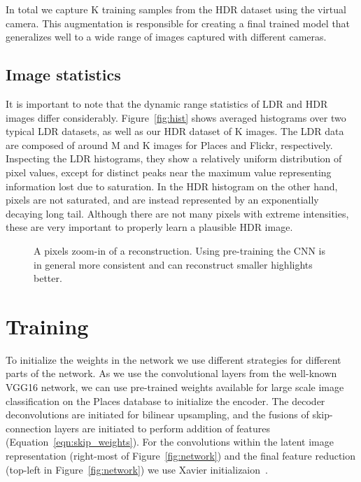 \documentclass[acmtog]{acmart}
\newcommand{\figref}[1]{Figure~\ref{fig:#1}}
\newcommand{\eqnref}[1]{Equation~\ref{eqn:#1}}
\newcommand\belowfigspace{-2pt}
\newcommand\customsection[1]{\subsection{#1}}
\begin{document}
In total we capture  K training samples from the HDR dataset using the virtual camera. This augmentation is responsible for creating a final trained model that generalizes well to a wide range of images captured with different cameras.

\customsection{Image statistics} It is important to note that the dynamic range statistics of LDR and HDR images differ considerably. \figref{hist} shows averaged histograms over two typical LDR datasets, as well as our HDR dataset of K images. The LDR data are composed of around M and K images for Places \cite{Zhou2014} and Flickr, respectively. Inspecting the LDR histograms, they show a relatively uniform distribution of pixel values, except for distinct peaks near the maximum value representing information lost due to saturation. In the HDR histogram on the other hand, pixels are not saturated, and are instead represented by an exponentially decaying long tail. Although there are not many pixels with extreme intensities, these are very important to properly learn a plausible HDR image. 

\begin{figure}[t]
	\newcommand\ww{0.116}
	\centering
	\vspace{-10pt}
	\caption{\label{fig:init} A  pixels zoom-in of a reconstruction. Using pre-training the CNN is in general more consistent and can reconstruct smaller highlights better.}
	\vspace{\belowfigspace}
\end{figure}

\section{Training}\label{sec:training}
To initialize the weights in the network we use different strategies for different parts of the network.
As we use the convolutional layers from the well-known VGG16 network, we can use pre-trained weights available for large scale image classification on the Places database \cite{Zhou2014} to initialize the encoder. The decoder deconvolutions are initiated for bilinear upsampling, and the fusions of skip-connection layers are initiated to perform addition of features (\eqnref{skip_weights}). For the convolutions within the latent image representation (right-most of \figref{network}) and the final feature reduction (top-left in \figref{network}) we use Xavier initializaion~\cite{Glorot2010}.
\end{document}
